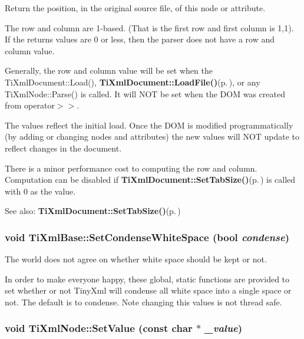 Return the position, in the original source file, of this node or attribute. 

The row and column are 1-based. (That is the first row and first column is 1,1). If the returns values are 0 or less, then the parser does not have a row and column value.

Generally, the row and column value will be set when the Ti\-Xml\-Document::Load(), {\bf Ti\-Xml\-Document::Load\-File()}{\rm (p.\,\pageref{classTiXmlDocument_TiXmlDocumenta6})}, or any Ti\-Xml\-Node::Parse() is called. It will NOT be set when the DOM was created from operator$>$$>$.

The values reflect the initial load. Once the DOM is modified programmatically (by adding or changing nodes and attributes) the new values will NOT update to reflect changes in the document.

There is a minor performance cost to computing the row and column. Computation can be disabled if {\bf Ti\-Xml\-Document::Set\-Tab\-Size()}{\rm (p.\,\pageref{classTiXmlDocument_TiXmlDocumenta20})} is called with 0 as the value.

\begin{Desc}
\item[See also:]{\bf Ti\-Xml\-Document::Set\-Tab\-Size()}{\rm (p.\,\pageref{classTiXmlDocument_TiXmlDocumenta20})}\end{Desc}
\subsubsection{\setlength{\rightskip}{0pt plus 5cm}void Ti\-Xml\-Base::Set\-Condense\-White\-Space (bool {\em condense})\hspace{0.3cm}{\tt  [inline, static, inherited]}}\label{classTiXmlBase_TiXmlUnknowne0}


The world does not agree on whether white space should be kept or not. 

In order to make everyone happy, these global, static functions are provided to set whether or not Tiny\-Xml will condense all white space into a single space or not. The default is to condense. Note changing this values is not thread safe.
\subsubsection{\setlength{\rightskip}{0pt plus 5cm}void Ti\-Xml\-Node::Set\-Value (const char $\ast$ {\em \_\-value})\hspace{0.3cm}{\tt  [inline, inherited]}}\label{classTiXmlNode_TiXmlUnknowna9}


